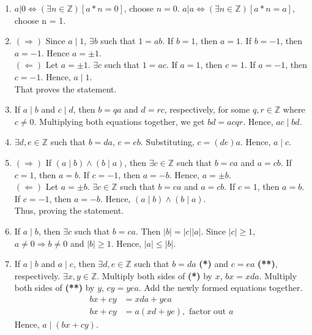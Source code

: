 \documentclass[11pt]{exam}
\begin{document}
\begin{enumerate}[leftmargin=0pt]
\begin{enumerate}[label=(\alph*)]
    \item $a | 0 \Leftrightarrow (\exists n \in \mathbb{Z})[a * n = 0]$, choose $n = 0$. $a | a \Leftrightarrow (\exists n \in \mathbb{Z})[a * n = a]$, choose n = 1.
    \item $(\Rightarrow)$ Since $a \mid 1$, $\exists b$ such that $1 = ab$. If $b = 1$, then $a = 1$. If $b = -1$, then $a = -1$. Hence $a = \pm 1$. \\
    $(\Leftarrow)$
    Let $a = \pm 1$. $\exists c$ such that $1 = ac$. If $a = 1$, then $c = 1$. If $a = -1$, then $c = -1$. Hence, $a \mid 1$. \\
    That proves the statement.
    \item If $a \mid b$ and $c \mid d$, then $b = qa$ and $d = rc$, respectively, for some $q, r \in \mathbb{Z}$ where $c \neq 0$. Multiplying both equations together, we get $bd = acqr$. Hence, $ac \mid bd$.
    \item $\exists d, e \in \mathbb{Z}$ such that $b = da$, $c = eb$. Substituting, $c = (de)a$. Hence, $a \mid c$.
    \item $(\Rightarrow)$ If $(a \mid b) \land (b \mid a)$, then $\exists c \in \mathbb{Z}$ such that $b = ca$ and $a = cb$. If $c = 1$, then $a = b$. If $c = -1$, then $a = -b$. Hence, $a = \pm b$. \\
    $(\Leftarrow)$ Let $a = \pm b$. $\exists c \in \mathbb{Z}$ such that $b = ca$ and $a = cb$. If $c = 1$, then $a = b$. If $c = -1$, then $a = -b$. Hence, $(a \mid b) \land (b \mid a)$. \\
    Thus, proving the statement.
    \item If $a \mid b$, then $\exists c$ such that $b = ca$. Then $|b| = |c||a|$. Since $|c| \geq 1$, $a \neq 0 \Rightarrow b \neq 0$ and $|b| \geq 1$. Hence, $|a| \leq |b|$.
    \item If $a \mid b$ and $a \mid c$, then $\exists d, e \in \mathbb{Z}$ such that $b = da$ \textbf{ (*)} and $c = ea$ \textbf{ (**)}, respectively. $\exists x, y \in \mathbb{Z}$. Multiply both sides of \textbf{(*)} by $x$, $bx = xda$. Multiply both sides of \textbf{(**)} by $y$, $cy = yea$. Add the newly formed equations together.
    \begin{align*}
        bx + cy &= xda + yea \\
        bx + cy &= a(xd + ye), \text{ factor out $a$}
    \end{align*}
    Hence, $a \mid (bx + cy)$.
\end{enumerate}


\end{enumerate}
\end{document}
